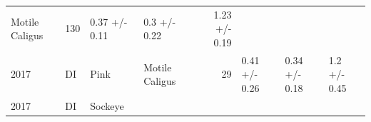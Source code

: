 \documentclass[fleqn,10pt]{wlpeerj} %
\begin{document}
\begin{longtable}[]{@{}llllrlll@{}}
\begin{minipage}[t]{0.11\columnwidth}
Motile Caligus\strut
\end{minipage} & \begin{minipage}[t]{0.04\columnwidth}\raggedleft\strut
130\strut
\end{minipage} & \begin{minipage}[t]{0.14\columnwidth}\raggedright\strut
0.37 +/- 0.11\strut
\end{minipage} & \begin{minipage}[t]{0.14\columnwidth}\raggedright\strut
0.3 +/- 0.22\strut
\end{minipage} & \begin{minipage}[t]{0.14\columnwidth}\raggedright\strut
1.23 +/- 0.19\strut
\end{minipage}\tabularnewline
\begin{minipage}[t]{0.09\columnwidth}\raggedright\strut
2017\strut
\end{minipage} & \begin{minipage}[t]{0.06\columnwidth}\raggedright\strut
DI\strut
\end{minipage} & \begin{minipage}[t]{0.06\columnwidth}\raggedright\strut
Pink\strut
\end{minipage} & \begin{minipage}[t]{0.11\columnwidth}\raggedright\strut
Motile Caligus\strut
\end{minipage} & \begin{minipage}[t]{0.04\columnwidth}\raggedleft\strut
29\strut
\end{minipage} & \begin{minipage}[t]{0.14\columnwidth}\raggedright\strut
0.41 +/- 0.26\strut
\end{minipage} & \begin{minipage}[t]{0.14\columnwidth}\raggedright\strut
0.34 +/- 0.18\strut
\end{minipage} & \begin{minipage}[t]{0.14\columnwidth}\raggedright\strut
1.2 +/- 0.45\strut
\end{minipage}\tabularnewline
\begin{minipage}[t]{0.09\columnwidth}\raggedright\strut
2017\strut
\end{minipage} & \begin{minipage}[t]{0.06\columnwidth}\raggedright\strut
DI\strut
\end{minipage} & \begin{minipage}[t]{0.06\columnwidth}\raggedright\strut
Sockeye\strut
\end{minipage} & \begin{minipage}[t]{0.11\columnwidth}\raggedright\strut

\end{minipage}
\end{longtable}
\end{document}
